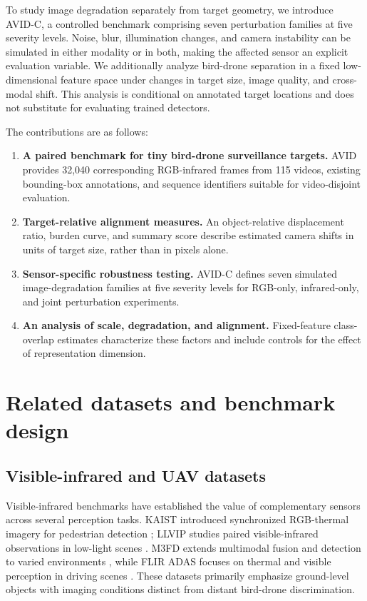 \documentclass[10pt]{article}
\newcommand{\dataset}{\textsc{AVID}}
\newcommand{\corrupt}{\textsc{AVID-C}}
\begin{document}
To study image degradation separately from target geometry, we introduce \corrupt{}, a controlled benchmark comprising seven perturbation families at five severity levels. Noise, blur, illumination changes, and camera instability can be simulated in either modality or in both, making the affected sensor an explicit evaluation variable. We additionally analyze bird-drone separation in a fixed low-dimensional feature space under changes in target size, image quality, and cross-modal shift. This analysis is conditional on annotated target locations and does not substitute for evaluating trained detectors.

The contributions are as follows:
\begin{enumerate}
    \item \textbf{A paired benchmark for tiny bird-drone surveillance targets.} \dataset{} provides 32,040 corresponding RGB-infrared frames from 115 videos, existing bounding-box annotations, and sequence identifiers suitable for video-disjoint evaluation.
    \item \textbf{Target-relative alignment measures.} An object-relative displacement ratio, burden curve, and summary score describe estimated camera shifts in units of target size, rather than in pixels alone.
    \item \textbf{Sensor-specific robustness testing.} \corrupt{} defines seven simulated image-degradation families at five severity levels for RGB-only, infrared-only, and joint perturbation experiments.
    \item \textbf{An analysis of scale, degradation, and alignment.} Fixed-feature class-overlap estimates characterize these factors and include controls for the effect of representation dimension.
\end{enumerate}

\section{Related datasets and benchmark design}
\label{sec:related}

\subsection{Visible-infrared and UAV datasets}

Visible-infrared benchmarks have established the value of complementary sensors across several perception tasks. KAIST introduced synchronized RGB-thermal imagery for pedestrian detection \citep{hwang2015kaist}; LLVIP studies paired visible-infrared observations in low-light scenes \citep{jia2021llvip}. M3FD extends multimodal fusion and detection to varied environments \citep{liu2022tardal}, while FLIR ADAS focuses on thermal and visible perception in driving scenes \citep{flir2018adas}. These datasets primarily emphasize ground-level objects with imaging conditions distinct from distant bird-drone discrimination.
\end{document}

